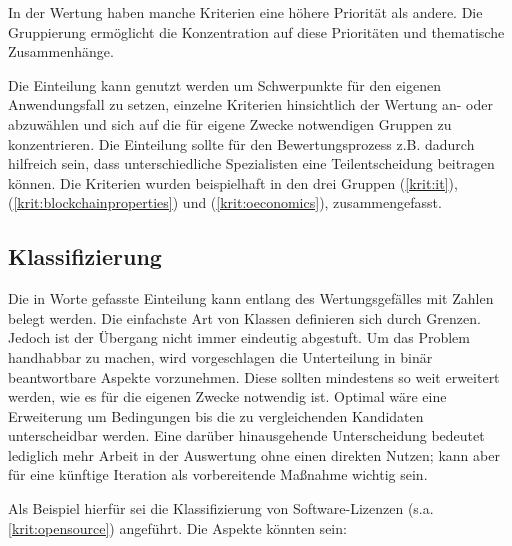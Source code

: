 In der Wertung haben manche Kriterien eine höhere Priorität als andere.
Die Gruppierung ermöglicht die Konzentration auf diese Prioritäten und thematische Zusammenhänge.

Die Einteilung kann genutzt werden um Schwerpunkte für den eigenen Anwendungsfall zu setzen,
einzelne Kriterien hinsichtlich der Wertung an- oder abzuwählen und sich auf die für eigene Zwecke notwendigen Gruppen zu konzentrieren.
Die Einteilung sollte für den Bewertungsprozess z.B. dadurch hilfreich sein, dass unterschiedliche Spezialisten eine Teilentscheidung beitragen können.
Die Kriterien wurden beispielhaft in den drei Gruppen  (\ref{krit:it}),  (\ref{krit:blockchainproperties}) und  (\ref{krit:oeconomics}), zusammengefasst.

\subsection{Klassifizierung}\label{classification}

Die in Worte gefasste Einteilung kann entlang des Wertungsgefälles mit Zahlen belegt werden.
Die einfachste Art von Klassen definieren sich durch Grenzen.
Jedoch ist der Übergang nicht immer eindeutig abgestuft.
Um das Problem handhabbar zu machen, wird vorgeschlagen die Unterteilung in binär beantwortbare Aspekte vorzunehmen.
Diese sollten mindestens so weit erweitert werden, wie es für die eigenen Zwecke notwendig ist.
Optimal wäre eine Erweiterung um Bedingungen bis die zu vergleichenden Kandidaten unterscheidbar werden.
Eine darüber hinausgehende Unterscheidung bedeutet lediglich mehr Arbeit in der Auswertung ohne einen direkten Nutzen; kann aber für eine künftige Iteration als vorbereitende Maßnahme wichtig sein.

Als Beispiel hierfür sei die Klassifizierung von Software-Lizenzen (s.a. \ref{krit:opensource}) angeführt.
Die Aspekte könnten sein:


